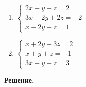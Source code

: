 \begin{enumerate}
    \item $\begin{cases}
              2x - y + z = 2 \\
              3x + 2y + 2z = -2 \\
              x - 2y + z = 1
    \end{cases}$
    \item $\begin{cases}
              x + 2y + 3z = 2 \\
              x + y + z = -1 \\
              3x + y - z = 3
    \end{cases}$
\end{enumerate}
\vspace{10mm}
\noindent\textbf{Решение.}\\

